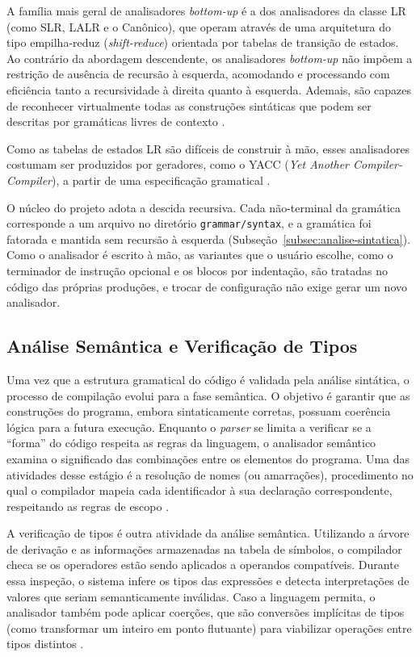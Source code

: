 A família mais geral de analisadores \textit{bottom-up} é a dos analisadores da classe LR (como SLR, LALR e o Canônico), que operam através de uma arquitetura do tipo empilha-reduz (\textit{shift-reduce}) orientada por tabelas de transição de estados. Ao contrário da abordagem descendente, os analisadores \textit{bottom-up} não impõem a restrição de ausência de recursão à esquerda, acomodando e processando com eficiência tanto a recursividade à direita quanto à esquerda. Ademais, são capazes de reconhecer virtualmente todas as construções sintáticas que podem ser descritas por gramáticas livres de contexto \cite{aho1995}. 

Como as tabelas de estados LR são difíceis de construir à mão, esses analisadores costumam ser produzidos por geradores, como o YACC (\textit{Yet Another Compiler-Compiler}), a partir de uma especificação gramatical \cite{cooper2012,appel2002}.

O núcleo do projeto adota a descida recursiva. Cada não-terminal da gramática corresponde a um arquivo no diretório \texttt{grammar/syntax}, e a gramática foi fatorada e mantida sem recursão à esquerda (Subseção~\ref{subsec:analise-sintatica}). Como o analisador é escrito à mão, as variantes que o usuário escolhe, como o terminador de instrução opcional e os blocos por indentação, são tratadas no código das próprias produções, e trocar de configuração não exige gerar um novo analisador.

\subsection{Análise Semântica e Verificação de Tipos}

Uma vez que a estrutura gramatical do código é validada pela análise sintática, o processo de compilação evolui para a fase semântica. O objetivo é garantir que as construções do programa, embora sintaticamente corretas, possuam coerência lógica para a futura execução. Enquanto o \textit{parser} se limita a verificar se a ``forma'' do código respeita as regras da linguagem, o analisador semântico examina o significado das combinações entre os elementos do programa. Uma das atividades desse estágio é a resolução de nomes (ou amarrações), procedimento no qual o compilador mapeia cada identificador à sua declaração correspondente, respeitando as regras de escopo \cite{aho1995,cooper2012}.

A verificação de tipos é outra atividade da análise semântica. Utilizando a árvore de derivação e as informações armazenadas na tabela de símbolos, o compilador checa se os operadores estão sendo aplicados a operandos compatíveis. Durante essa inspeção, o sistema infere os tipos das expressões e detecta interpretações de valores que seriam semanticamente inválidas. Caso a linguagem permita, o analisador também pode aplicar coerções, que são conversões implícitas de tipos (como transformar um inteiro em ponto flutuante) para viabilizar operações entre tipos distintos \cite{price2001,nystrom2021}.

